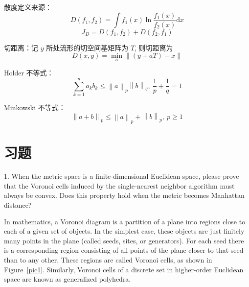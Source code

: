 \documentclass[openany]{ctexbook}
\theoremstyle{kaiti}
\theoremstyle{normal}
\begin{document}
散度定义来源：
\begin{equation}
D\left(f_1,f_2 \right)=\int f_1(x)\ln\frac{f_1(x)}{f_2(x)} \mathrm{d}x
\end{equation}
\begin{equation}
J_D=D\left(f_1,f_2 \right)+D\left(f_2,f_1 \right)
\end{equation}

切距离：记 $y$ 所处流形的切空间基矩阵为 $T$, 则切距离为
\begin{equation}
D\left(x,y \right)=\min_a\left\| \left(y+aT \right)-x \right\|
\end{equation}

Holder 不等式：
\begin{equation}
\sum_{k=1}^{n}a_kb_k\leqslant \left\| a \right\|_p\left\| b \right\|_q,~\frac{1}{p}+\frac{1}{q}=1
\end{equation}

Minkowski 不等式：
\begin{equation}
\left\| a+b \right\|_p\leqslant \left\| a \right\|_p+\left\| b \right\|_p,~p\geqslant 1
\end{equation}

\section{习题}


1. When the metric space is a finite-dimensional Euclidean space, please prove that the Voronoi cells induced by the single-nearest neighbor algorithm must always be convex. Does this property hold when the metric becomes Manhattan distance?

In mathematics, a Voronoi diagram is a partition of a plane into regions close to each of a given set of objects. In the simplest case, these objects are just finitely many points in the plane (called seeds, sites, or generators). For each seed there is a corresponding region consisting of all points of the plane closer to that seed than to any other. These regions are called Voronoi cells, as shown in Figure~\ref{pic1}. Similarly, Voronoi cells of a discrete set in higher-order Euclidean space are known as generalized polyhedra.
\end{document}
